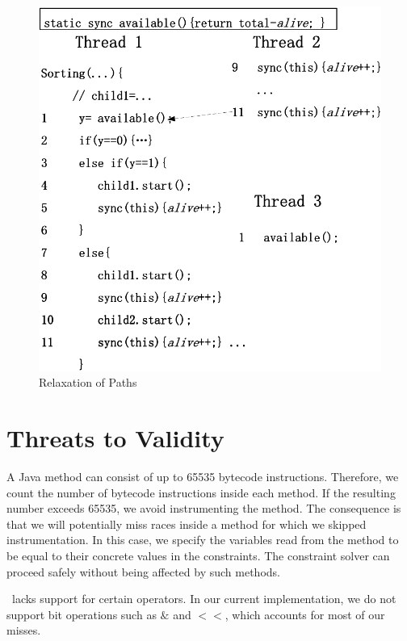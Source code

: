  


\begin{figure}[htp]
\centering
\includegraphics[scale=0.45]{figs/Visio-msort.pdf}
\caption{Relaxation of Paths}\label{fig:relax2}
\vspace{-2em}
\end{figure}


\section{Threats to Validity}
A Java method can consist of up to 65535 bytecode instructions. Therefore,
 we count the number of bytecode instructions inside each method. If the 
resulting number exceeds 65535, we avoid instrumenting the method. 
The consequence is that we will potentially miss races inside a method for 
which we skipped instrumentation. In this case, we specify the variables 
read from the method to be equal to their concrete values in the constraints. 
The constraint solver can proceed safely without being affected by 
such methods.

\tool\  lacks support for certain operators. In our current 
implementation, we do not support bit operations such as $\&$ and $<<$, which accounts for most of our misses.



